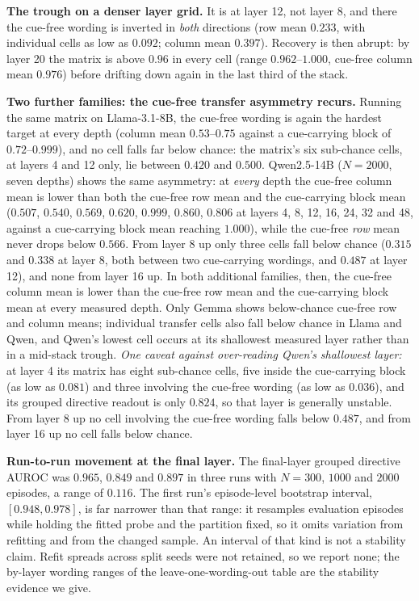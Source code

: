 \documentclass{article}
\begin{document}
\textbf{The trough on a denser layer grid.} It is at layer 12, not layer 8, and there the cue-free wording
is inverted in \emph{both} directions (row mean $0.233$, with individual cells as low as $0.092$; column mean
$0.397$). Recovery is then abrupt: by layer 20 the matrix is above $0.96$ in every cell (range $0.962$--$1.000$, cue-free column mean $0.976$) before drifting down again in the last third of the stack.

\textbf{Two further families: the cue-free transfer asymmetry recurs.} Running the same matrix on Llama-3.1-8B, the cue-free wording is again the hardest
target at every depth (column mean $0.53$--$0.75$ against a cue-carrying block of $0.72$--$0.999$), and no cell falls far below chance: the matrix's six sub-chance cells, at layers 4 and 12 only, lie between $0.420$ and $0.500$. Qwen2.5-14B ($N{=}2000$, seven depths) shows the same
asymmetry: at \emph{every} depth the cue-free column mean is lower than both the cue-free row mean and the cue-carrying block mean
($0.507$, $0.540$, $0.569$, $0.620$, $0.999$, $0.860$, $0.806$ at layers 4, 8, 12, 16, 24, 32 and 48, against a cue-carrying block mean
reaching $1.000$), while the cue-free \emph{row} mean never drops below $0.566$. From layer 8 up only three cells fall below chance ($0.315$ and $0.338$ at layer 8, both between two cue-carrying wordings, and $0.487$ at layer 12), and none from layer 16 up. In both additional families, then, the cue-free column mean is lower than the cue-free row mean and the cue-carrying block mean at every measured depth. Only Gemma shows below-chance cue-free row and column means; individual transfer cells also fall below chance in Llama and Qwen, and Qwen's lowest cell occurs at its shallowest measured layer rather than in a mid-stack trough.
\emph{One caveat against over-reading Qwen's shallowest layer:} at layer 4 its matrix has eight sub-chance
cells, five inside the cue-carrying block (as low as $0.081$) and three involving the cue-free wording (as low as $0.036$), and its grouped directive readout
is only $0.824$, so that layer is generally unstable. From layer 8 up no cell involving the cue-free wording falls below $0.487$, and from layer 16 up no cell falls below chance.

\textbf{Run-to-run movement at the final layer.} The final-layer grouped directive AUROC was $0.965$, $0.849$ and $0.897$ in three runs with $N = 300$, $1000$ and $2000$ episodes, a range of $0.116$. The first run's episode-level bootstrap interval, $[0.948, 0.978]$, is far narrower than that range: it resamples evaluation episodes while holding the fitted probe and the partition fixed, so it omits variation from refitting and from the changed sample. An interval of that kind is not a stability claim. Refit spreads across split seeds were not retained, so we report none; the by-layer wording ranges of the leave-one-wording-out table are the stability evidence we give.
\end{document}
